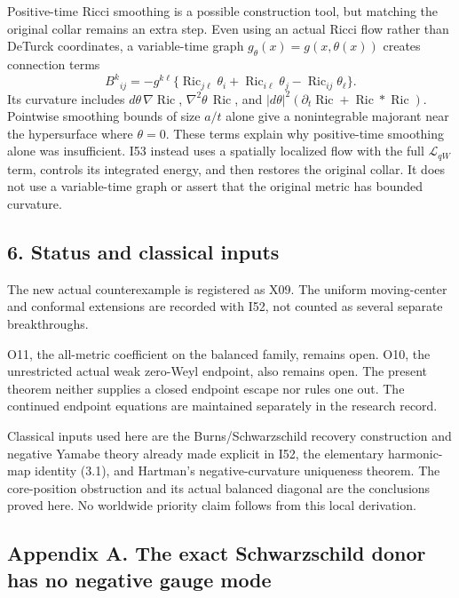 \documentclass[
  11pt,
]{article}
\begin{document}
Positive-time Ricci smoothing is a possible construction tool, but
matching the original collar remains an extra step. Even using an actual
Ricci flow rather than DeTurck coordinates, a variable-time graph
\(g_\theta(x)=g(x,\theta(x))\) creates connection terms \[
 B^k{}_{ij}
 =-g^{k\ell}\{\operatorname{Ric}_{j\ell}\theta_i
             +\operatorname{Ric}_{i\ell}\theta_j
             -\operatorname{Ric}_{ij}\theta_\ell\}.            \tag{5.3}
\] Its curvature includes \(d\theta\,\nabla\operatorname{Ric}\),
\(\nabla^2\theta\,\operatorname{Ric}\), and
\(|d\theta|^2(\partial_t\operatorname{Ric}  +\operatorname{Ric}*\operatorname{Ric})\).
Pointwise smoothing bounds of size \(a/t\) alone give a nonintegrable
majorant near the hypersurface where \(\theta=0\). These terms explain
why positive-time smoothing alone was insufficient. I53 instead uses a
spatially localized flow with the full \(\mathcal L_{qW}\) term,
controls its integrated energy, and then restores the original collar.
It does not use a variable-time graph or assert that the original metric
has bounded curvature.

\hypertarget{status-and-classical-inputs}{%
\subsection{6. Status and classical
inputs}\label{status-and-classical-inputs}}

The new actual counterexample is registered as X09. The uniform
moving-center and conformal extensions are recorded with I52, not
counted as several separate breakthroughs.

O11, the all-metric coefficient on the balanced family, remains open.
O10, the unrestricted actual weak zero-Weyl endpoint, also remains open.
The present theorem neither supplies a closed endpoint escape nor rules
one out. The continued endpoint equations are maintained separately in
the research record.

Classical inputs used here are the Burns/Schwarzschild recovery
construction and negative Yamabe theory already made explicit in I52,
the elementary harmonic-map identity (3.1), and Hartman's
negative-curvature uniqueness theorem. The core-position obstruction and
its actual balanced diagonal are the conclusions proved here. No
worldwide priority claim follows from this local derivation.

\hypertarget{appendix-a.-the-exact-schwarzschild-donor-has-no-negative-gauge-mode}{%
\subsection{Appendix A. The exact Schwarzschild donor has no negative
gauge
mode}\label{appendix-a.-the-exact-schwarzschild-donor-has-no-negative-gauge-mode}}
\end{document}
